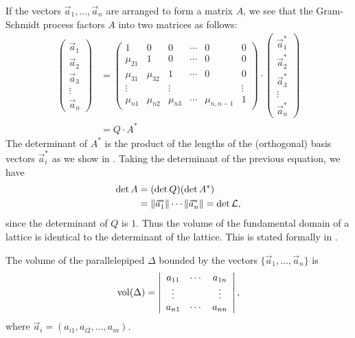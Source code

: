 If the vectors $\vec{a}_1, \ldots, \vec{a}_n$ are arranged to form a
matrix $A$, we see that the Gram-Schmidt process factors $A$ into two
matrices as follows:
\begin{equation} \label{Gram:Schmidt:Eq}
\begin{aligned}
\left(
 \begin{array}{c}
   \vec{a}_1 \\ \vec{a}_2 \\ \vec{a}_3 \\ \vdots \\ \vec{a}_n
 \end{array}
\right)
 & = 
\left(
 \begin{array}{cccccc}
   1 & 0 & 0 & \cdots & 0 & 0 \\ 
   \mu_{21} & 1 & 0 & \cdots & 0 & 0 \\ 
   \mu_{31} & \mu_{32} & 1 & \cdots & 0 & 0 \\
   \vdots & & \vdots & & & \vdots \\ 
   \mu_{n1} & \mu_{n2} & \mu_{n3} & \cdots & \mu_{n,n-1} & 1
 \end{array}
\right)
\cdot 
\left(
 \begin{array}{c}
   \vec{a}^{\ast}_1 \\ \vec{a}^{\ast}_2 \\ \vec{a}^{\ast}_3 \\ 
   \vdots \\ \vec{a}^{\ast}_n
 \end{array}
\right) \\
 & = Q \cdot A^{\ast}
\end{aligned}
\end{equation}
The determinant of $A^{\ast}$ is the product of the lengths of the
(orthogonal) basis vectors $\vec{a}^{\ast}_i$ as we show in
.
Taking the determinant of the previous equation, we have
\[
\begin{aligned}
  \det A & = (\det Q) (\det A^{\ast}) \\
    & = \|\vec{a}^{\ast}_1\| \cdots \|\vec{a}^{\ast}_n\| = \det {\cal L},
\end{aligned}
\]
since the determinant of $Q$ is $1$.
Thus the volume of the fundamental domain of a lattice is identical to
the determinant of the lattice.  This is stated formally in
.  

\begin{proposition}\label{Parallelepiped:Vol:Prop}
The volume of the parallelepiped $\Delta$ bounded by the vectors
$\{\vec{a}_{1}, \ldots, \vec{a}_{n}\}$ is
\[
\mathop{\rm vol}\nolimits(\Delta) = \left|
\begin{array}{ccc}
a_{11} & \cdots & a_{1n} \\
\vdots &   & \vdots \\
a_{n1} & \cdots & a_{nn}
\end{array}
\right|,
\]
where $\vec{a}_{i} = (a_{i1}, a_{i2}, \ldots, a_{in})$.
\end{proposition}


